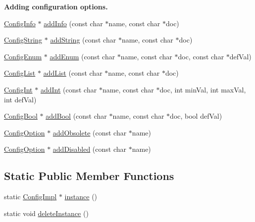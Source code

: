 \begin{Indent}\textbf{ Adding configuration options.}\par
\begin{DoxyCompactItemize}
\item 
\mbox{\hyperlink{class_config_info}{Config\+Info}} $\ast$ \mbox{\hyperlink{class_config_impl_af7a7fe31c6efe3e86a2bea7cc547010e}{add\+Info}} (const char $\ast$name, const char $\ast$doc)
\item 
\mbox{\hyperlink{class_config_string}{Config\+String}} $\ast$ \mbox{\hyperlink{class_config_impl_ae3e256ad02c67224c0d005372b4bd94a}{add\+String}} (const char $\ast$name, const char $\ast$doc)
\item 
\mbox{\hyperlink{class_config_enum}{Config\+Enum}} $\ast$ \mbox{\hyperlink{class_config_impl_a7731299f0826fbb02b6b368a75c801a4}{add\+Enum}} (const char $\ast$name, const char $\ast$doc, const char $\ast$def\+Val)
\item 
\mbox{\hyperlink{class_config_list}{Config\+List}} $\ast$ \mbox{\hyperlink{class_config_impl_a9b4b476dc6a6c4e5e1f54b63dbd20d13}{add\+List}} (const char $\ast$name, const char $\ast$doc)
\item 
\mbox{\hyperlink{class_config_int}{Config\+Int}} $\ast$ \mbox{\hyperlink{class_config_impl_a420984f55853ed6720b12d1326d986d7}{add\+Int}} (const char $\ast$name, const char $\ast$doc, int min\+Val, int max\+Val, int def\+Val)
\item 
\mbox{\hyperlink{class_config_bool}{Config\+Bool}} $\ast$ \mbox{\hyperlink{class_config_impl_aa555f51d70432403c234259dca81f666}{add\+Bool}} (const char $\ast$name, const char $\ast$doc, bool def\+Val)
\item 
\mbox{\hyperlink{class_config_option}{Config\+Option}} $\ast$ \mbox{\hyperlink{class_config_impl_a68405127d051b129bb0c3ac43bc238dc}{add\+Obsolete}} (const char $\ast$name)
\item 
\mbox{\hyperlink{class_config_option}{Config\+Option}} $\ast$ \mbox{\hyperlink{class_config_impl_a6944e4722cb76a3630fb42fafa52e0f2}{add\+Disabled}} (const char $\ast$name)
\end{DoxyCompactItemize}
\end{Indent}
\subsection*{Static Public Member Functions}
\begin{DoxyCompactItemize}
\item 
static \mbox{\hyperlink{class_config_impl}{Config\+Impl}} $\ast$ \mbox{\hyperlink{class_config_impl_a1415dd4c0a72ff3b7a36829eecb8944d}{instance}} ()
\item 
static void \mbox{\hyperlink{class_config_impl_a11be9a99f82898b014f311b5fd9437c1}{delete\+Instance}} ()
\end{DoxyCompactItemize}


